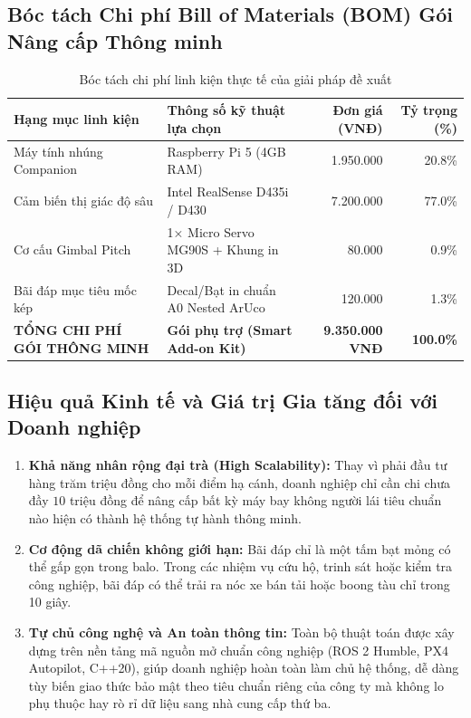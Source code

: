 \documentclass[12pt,a4paper]{article}
\begin{document}
\subsection{Bóc tách Chi phí Bill of Materials (BOM) Gói Nâng cấp Thông minh}

\begin{table}[h!]
\centering
\small
\begin{tabularx}{\textwidth}{@{}l X r r@{}}
\toprule
\textbf{Hạng mục linh kiện} & \textbf{Thông số kỹ thuật lựa chọn} & \textbf{Đơn giá (VNĐ)} & \textbf{Tỷ trọng (\%)} \\ \midrule
Máy tính nhúng Companion & Raspberry Pi 5 (4GB RAM) & 1.950.000 & 20.8\% \\
Cảm biến thị giác độ sâu & Intel RealSense D435i / D430 & 7.200.000 & 77.0\% \\
Cơ cấu Gimbal Pitch & 1× Micro Servo MG90S + Khung in 3D & 80.000 & 0.9\% \\
Bãi đáp mục tiêu mốc kép & Decal/Bạt in chuẩn A0 Nested ArUco & 120.000 & 1.3\% \\ \midrule
\textbf{TỔNG CHI PHÍ GÓI THÔNG MINH} & \textbf{Gói phụ trợ (Smart Add-on Kit)} & \textbf{9.350.000 VNĐ} & \textbf{100.0\%} \\ \bottomrule
\end{tabularx}
\caption{Bóc tách chi phí linh kiện thực tế của giải pháp đề xuất}
\label{tab:bom_cost}
\end{table}

\subsection{Hiệu quả Kinh tế và Giá trị Gia tăng đối với Doanh nghiệp}
\begin{enumerate}[noitemsep,topsep=2pt]
    \item \textbf{Khả năng nhân rộng đại trà (High Scalability):} Thay vì phải đầu tư hàng trăm triệu đồng cho mỗi điểm hạ cánh, doanh nghiệp chỉ cần chi chưa đầy $10$ triệu đồng để nâng cấp bất kỳ máy bay không người lái tiêu chuẩn nào hiện có thành hệ thống tự hành thông minh.
    \item \textbf{Cơ động dã chiến không giới hạn:} Bãi đáp chỉ là một tấm bạt mỏng có thể gấp gọn trong balo. Trong các nhiệm vụ cứu hộ, trinh sát hoặc kiểm tra công nghiệp, bãi đáp có thể trải ra nóc xe bán tải hoặc boong tàu chỉ trong 10 giây.
    \item \textbf{Tự chủ công nghệ và An toàn thông tin:} Toàn bộ thuật toán được xây dựng trên nền tảng mã nguồn mở chuẩn công nghiệp (ROS 2 Humble, PX4 Autopilot, C++20), giúp doanh nghiệp hoàn toàn làm chủ hệ thống, dễ dàng tùy biến giao thức bảo mật theo tiêu chuẩn riêng của công ty mà không lo phụ thuộc hay rò rỉ dữ liệu sang nhà cung cấp thứ ba.
\end{enumerate}
\end{document}
